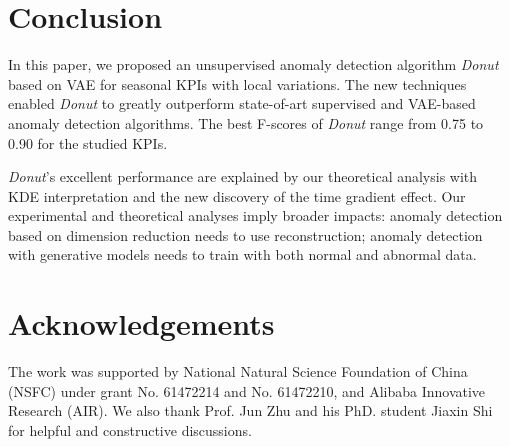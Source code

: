 \documentclass[sigconf]{acmart}
\newcommand{\DONUT}{\textit{Donut}}
\begin{document}
\section{Conclusion}
\label{sec:conclusion}

In this paper, we proposed an unsupervised anomaly detection algorithm  \DONUT{} based on VAE for seasonal KPIs with local variations. The new techniques enabled \DONUT{} to greatly outperform state-of-art supervised and VAE-based anomaly detection algorithms.  The best F-scores of \DONUT{} range from 0.75 to 0.90 for the studied KPIs.

\DONUT{}'s excellent performance are explained by our theoretical analysis with KDE interpretation and the new discovery of the time gradient effect. Our experimental and theoretical analyses imply broader impacts: anomaly detection based on dimension reduction needs to use reconstruction; anomaly detection with generative models needs to train with both normal and abnormal data.


\section{Acknowledgements}

The work was supported by National Natural Science Foundation of China (NSFC) under grant  No. 61472214 and No. 61472210, and Alibaba Innovative Research (AIR).
We also thank Prof. Jun Zhu and his PhD. student Jiaxin Shi for helpful and constructive discussions.



%



\newpage


\end{document}
